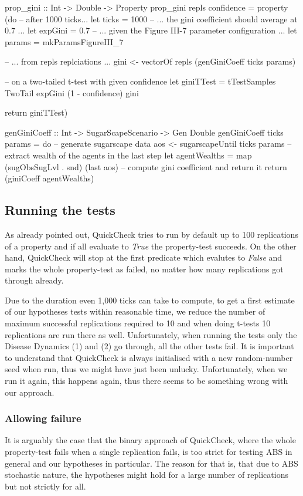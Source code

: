 \begin{HaskellCode}
prop_gini :: Int -> Double -> Property
prop_gini repls confidence = property (do
  -- after 1000 ticks...
  let ticks = 1000
  -- ... the gini coefficient should average at 0.7 ...
  let expGini = 0.7
  -- ... given the Figure III-7 parameter configuration ...
  let params = mkParamsFigureIII_7
  
  -- ... from repls replciations ... 
  gini <- vectorOf repls (genGiniCoeff ticks params)

  -- on a two-tailed t-test with given confidence
  let giniTTest = tTestSamples TwoTail expGini (1 - confidence) gini

  return giniTTest)
  
genGiniCoeff :: Int -> SugarScapeScenario -> Gen Double
genGiniCoeff ticks params = do
  -- generate sugarscape data
  aos <- sugarscapeUntil ticks params
  -- extract wealth of the agents in the last step
  let agentWealths = map (sugObsSugLvl . snd) (last aos)
  -- compute gini coefficient and return it
  return (giniCoeff agentWealths)
\end{HaskellCode}

\subsection{Running the tests}
As already pointed out, QuickCheck tries to run by default up to 100 replications  of a property and if all evaluate to \textit{True} the property-test succeeds. On the other hand, QuickCheck will stop at the first predicate which evalutes to \textit{False} and marks the whole property-test as failed, no matter how many replications got through already. 

Due to the duration even 1,000 ticks can take to compute, to get a first estimate of our hypotheses tests within reasonable time, we reduce the number of maximum successful replications required to 10 and when doing t-tests 10 replications are run there as well. Unfortunately, when running the tests only the Disease Dynamics (1) and (2) go through, all the other tests fail. It is important to understand that QuickCheck is always initialised with a new random-number seed when run, thus we might have just been unlucky. Unfortunately, when we run it again, this happens again, thus there seems to be something wrong with our approach.

\subsubsection{Allowing failure}
It is arguably the case that the binary approach of QuickCheck, where the whole property-test fails when a single replication fails, is too strict for testing ABS in general and our hypotheses in particular. The reason for that is, that due to ABS stochastic nature, the hypotheses might hold for a large number of replications but not strictly for all.

